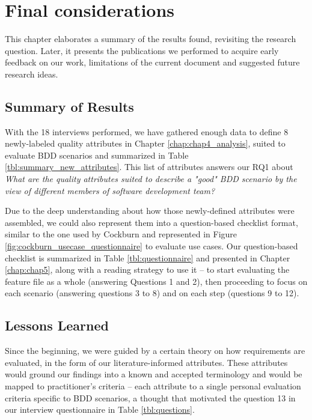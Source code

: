 \chapter{\label{chap:chap6}{Final considerations}}

This chapter elaborates a summary of the results found, revisiting the research question. Later, it presents the publications we performed to acquire early feedback on our work, limitations of the current document and suggested future research ideas.

\section{Summary of Results}

With the 18 interviews performed, we have gathered enough data to define 8 newly-labeled quality attributes in Chapter \ref{chap:chap4_analysis}, suited to evaluate BDD scenarios and summarized in Table \ref{tbl:summary_new_attributes}. This list of attributes answers our RQ1 about \textit{What are the quality attributes suited to describe a "good" BDD scenario by the view of different members of software development team?}

Due to the deep understanding about how those newly-defined attributes were assembled, we could also represent them into a question-based checklist format, similar to the one used by Cockburn \cite{Cockburn_2000} and represented in Figure \ref{fig:cockburn_usecase_questionnaire} to evaluate use cases. Our question-based checklist is summarized in Table \ref{tbl:questionnaire} and presented in Chapter \ref{chap:chap5}, along with a reading strategy to use it -- to start evaluating the feature file as a whole (answering Questions 1 and 2), then proceeding to focus on each scenario (answering questions 3 to 8) and on each step (questions 9 to 12).

\section{Lessons Learned}

Since the beginning, we were guided by a certain theory on how requirements are evaluated, in the form of our literature-informed attributes. These attributes would ground our findings into a known and accepted terminology and would be mapped to practitioner's criteria -- each attribute to a single personal evaluation criteria specific to BDD scenarios, a thought that motivated the question 13 in our interview questionnaire in Table \ref{tbl:questions}.

